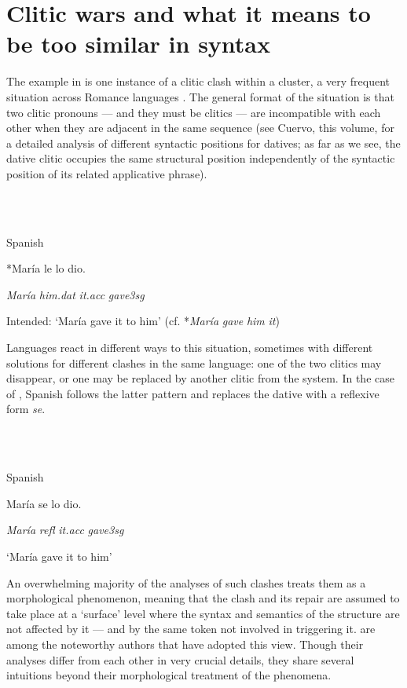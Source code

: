 \documentclass[output=paper,colorlinks,citecolor=brown]{./langscibook}
\begin{document}
\section{Clitic wars and what it means to be too similar in syntax} %

The example in  is one instance of a clitic clash within a cluster, a very frequent situation across Romance languages \citep{Rezac2010}. The general format of the situation is that two clitic pronouns — and they must be clitics — are incompatible with each other when they are adjacent in the same sequence (see Cuervo, this volume, for a detailed analysis of different syntactic positions for datives; as far as we see, the dative clitic occupies the same structural position independently of the syntactic position of its related applicative phrase). 

\ea%
    \label{ex:key:1}
    \gll\\
        \\
    \glt
    \z

          Spanish

    *María   le     lo   dio.       

      \textit{María}   \textit{him.dat}  \textit{it.acc}  \textit{gave3sg}

    Intended: ‘María gave it to him’ (cf. *\textit{María} \textit{gave} \textit{him} \textit{it})  

Languages react in different ways to this situation, sometimes with different solutions for different clashes in the same language: one of the two clitics may disappear, or one may be replaced by another clitic from the system. In the case of , Spanish follows the latter pattern and replaces the dative with a reflexive form \textit{se}.

\ea%
    \label{ex:key:2}
    \gll\\
        \\
    \glt
    \z

          Spanish

    María  se  lo    dio.

    \textit{María}  \textit{refl}  \textit{it.acc}  \textit{gave3sg}

    ‘María gave it to him’

 An overwhelming majority of the analyses of such clashes treats them as a morphological phenomenon, meaning that the clash and its repair are assumed to take place at a ‘surface’ level where the syntax and semantics of the structure are not affected by it — and by the same token not involved in triggering it. \citet{Perlmutter1971, Bonet1991, Bonet1993, Bonet1995, Grimshaw1997, Pescarini2007, Nevins2012} are among the noteworthy authors that have adopted this view. Though their analyses differ from each other in very crucial details, they share several intuitions beyond their morphological treatment of the phenomena. 
\end{document}
